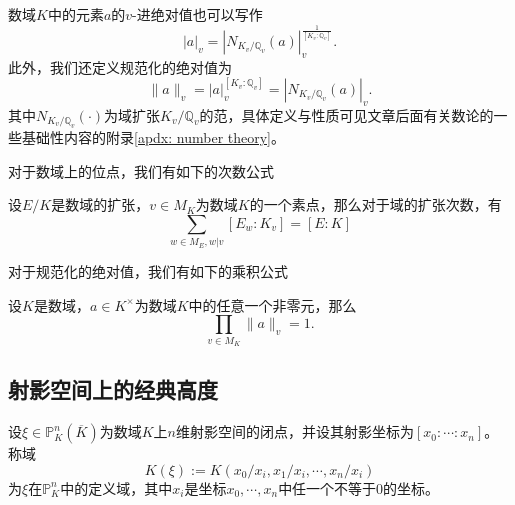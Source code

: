 数域$K$中的元素$a$的$v$-进绝对值也可以写作
\begin{equation}
|a|_v = \left|N_{K_v/\mathbb{Q}_v}(a)\right|_v^{\frac{1}{[K_v:\mathbb{Q}_v]}}.
\end{equation}
此外，我们还定义规范化的绝对值为
\begin{equation}
\|a\|_v = |a|_v^{[K_v:\mathbb{Q}_v]} = \left|N_{K_v/\mathbb{Q}_v}(a)\right|_v.
\end{equation}
其中$N_{K_v/\mathbb{Q}_v}(\cdot)$为域扩张$K_v/\mathbb{Q}_v$的范，具体定义与性质可见文章后面有关数论的一些基础性内容的附录\ref{apdx: number theory}。

对于数域上的位点，我们有如下的次数公式

\begin{proposition}[次数公式]
设$E/K$是数域的扩张，$v\in M_K$为数域$K$的一个素点，那么对于域的扩张次数，有
\begin{equation} \label{degree formula}
\sum\limits_{w\in M_E, w|v} [E_w:K_v] = [E:K]
\end{equation}
\end{proposition}

对于规范化的绝对值，我们有如下的乘积公式
\begin{proposition}[乘积公式]
设$K$是数域，$a\in K^\times$为数域$K$中的任意一个非零元，那么
\begin{equation} \label{product formula}
\prod\limits_{v\in M_K} \|a\|_v = 1.
\end{equation}
\end{proposition}

\subsection{射影空间上的经典高度}
\label{height on projective spaces}
\begin{definition}
设$\xi\in\mathbb{P}^n_K(\overline{K})$为数域$K$上$n$维射影空间的闭点，并设其射影坐标为$[x_0:\cdots:x_n]$。称域
\begin{equation} \label{field of definition}
K(\xi) := K(x_0/x_i,x_1/x_i,\cdots,x_n/x_i)
\end{equation}
为$\xi$在$\mathbb{P}^n_K$中的定义域，其中$x_i$是坐标$x_0,\cdots,x_n$中任一个不等于0的坐标。
\end{definition}

